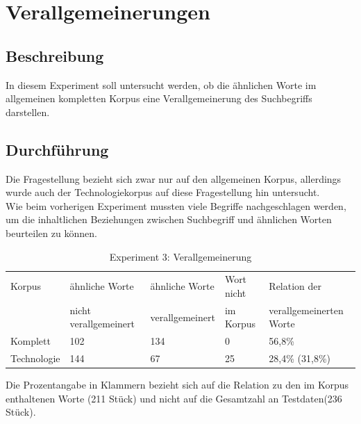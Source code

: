 \documentclass[12pt,a4paper]{report}
\begin{document}
		
	\newpage
	\section{Verallgemeinerungen}
		\subsection{Beschreibung}
		In diesem Experiment soll untersucht werden, ob die ähnlichen Worte im allgemeinen kompletten Korpus eine Verallgemeinerung des Suchbegriffs darstellen.\\
		
		\subsection{Durchführung}
		Die Fragestellung bezieht sich zwar nur auf den allgemeinen Korpus, allerdings wurde auch der Technologiekorpus auf diese Fragestellung hin untersucht.\\
		Wie beim vorherigen Experiment mussten viele Begriffe nachgeschlagen werden,  um die inhaltlichen Beziehungen zwischen Suchbegriff und ähnlichen Worten beurteilen zu können.\\
		
\begin{table}[h]
\caption{Experiment 3: Verallgemeinerung}
\begin{center}
\begin{tabular}{|l||l|l|l|l|}
\hline
Korpus & ähnliche Worte & ähnliche Worte  & Wort nicht  & Relation der\\
 & nicht verallgemeinert & verallgemeinert & im Korpus & verallgemeinerten Worte\\

\hline
\hline
 Komplett & 102 & 134 & 0 & 56,8\% \\
 \hline
 Technologie & 144 & 67 & 25 & 28,4\% (31,8\%)\\
 \hline
 
\end{tabular}
\end{center}
\end{table}

		Die Prozentangabe in Klammern bezieht sich auf die Relation zu den im Korpus enthaltenen Worte (211 Stück) und nicht auf die Gesamtzahl an Testdaten(236 Stück).\\
		
\end{document}

